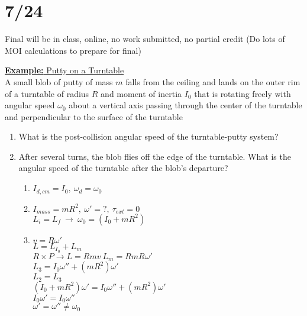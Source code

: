 \documentclass[a4paper]{article}
\let\bf\textbf
\begin{document}
\section{7/24}
Final will be in class, online, no work submitted, no partial credit (Do lots of MOI calculations to prepare for final)
\begin{shaded}
    \underline{\bf{Example:} Putty on a Turntable}
    \vspace{2mm}\\
    A small blob of putty of mass $m$ falls from the ceiling and lands on the outer rim of a turntable of radius $R$ and moment of inertia $I_0$ that is rotating freely with angular speed $\omega_0$ about a vertical axis passing through the center of the turntable and perpendicular to the surface of the turntable
    \begin{enumerate}
        \item What is the post-collision angular speed of the turntable-putty system?
        \item After several turns, the blob flies off the edge of the turntable. What is the angular speed of the turntable after the blob's departure?
        \begin{enumerate}       
            \item $I_{d,cm} = I_0,\ \omega_d = \omega_0$
            \item $I_{mass} = mR^2,\ \omega' = ?,\ \tau_{ext} = 0$\\
            $L_i = L_f\ \to\ \omega_0 = (I_0 + mR^2)$
            \item $v = R\omega'$\\
            $L = L_{I_0} + L_m$\\
            $R\times P \to L = Rmv\ L_m = RmR\omega'$\\
            $L_3 = I_0\omega'' + (mR^2)\omega'$\\
            $L_2 = L_3$\\
            $(I_0 + mR^2)\omega' = I_0\omega'' + (mR^2)\omega'$\\
            $I_0\omega' = I_0\omega''$\\
            $\omega' = \omega'' \neq \omega_0$
        \end{enumerate}
    \end{enumerate}
\end{shaded}
\end{document}
